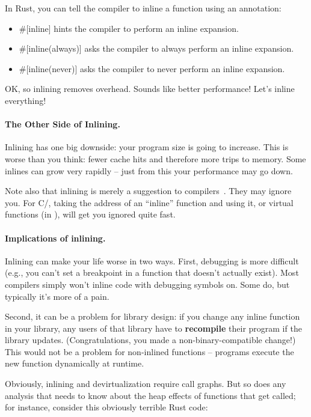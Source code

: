 In Rust, you can tell the compiler to inline a function using an annotation:
\begin{itemize}[noitemsep]
 \item \#[inline] hints the compiler to perform an inline expansion.
 \item \#[inline(always)] asks the compiler to always perform an inline expansion.
 \item \#[inline(never)] asks the compiler to never perform an inline expansion.
\end{itemize}

OK, so inlining removes overhead. Sounds like better performance! Let's inline everything!


\paragraph{The Other Side of Inlining.}
Inlining has one big downside: your program size is going to increase. This is worse than you think: fewer cache hits and therefore more trips to memory. Some inlines can grow very rapidly -- just from this your performance may go down.

Note also that inlining is merely a suggestion to compilers~\cite{gcc:inlining}. They may ignore you. For C/\CPP, 
 taking the address of an ``inline'' function and using it, or
 virtual functions (in \CPP), will get you ignored quite fast.

\paragraph{Implications of inlining.} Inlining can make your life worse in two ways.
First, debugging is more difficult (e.g., you can't set a breakpoint in a function that
  doesn't actually exist).
 Most compilers simply won't inline code with debugging symbols on.
 Some do, but typically it's more of a pain.

Second, it can be a problem for library design: if you change any inline function in your library, any users
      of that library have to {\bf recompile} their program if the
      library updates. (Congratulations, you made a non-binary-compatible change!) This would not be a problem for non-inlined functions -- programs execute the new function
dynamically at runtime.

Obviously, inlining and devirtualization require call graphs. But so
does any analysis that needs to know about the heap effects of
functions that get called; for instance, consider this obviously terrible Rust code:

